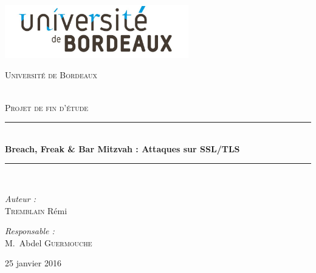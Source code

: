 \documentclass[a4paper,11pt,final]{article}
\newcommand{\reporttitle}{Breach, Freak \& Bar Mitzvah : Attaques sur SSL/TLS}     %
\newcommand{\reportauthor}{\textsc{Tremblain} Rémi} %
\newcommand{\reportsubject}{Projet de fin d'étude} %
\newcommand{\HRule}{\rule{\linewidth}{0.5mm}}
\begin{document}
%

\begin{titlepage}

\begin{center}

\begin{minipage}[t]{0.48\textwidth}
  \begin{flushleft}
    \includegraphics [width=80mm]{images/logo-univ.jpg} \\[0.5cm]
    \begin{spacing}{1.5}
      \textsc{\LARGE Université de Bordeaux}
    \end{spacing}
  \end{flushleft}
\end{minipage} \\[3.5cm]

\textsc{\Large \reportsubject}\\[0.5cm]
\HRule \\[0.4cm]
{\huge \bfseries \reporttitle}\\[0.4cm]
\HRule \\[1.5cm]

\begin{minipage}[t]{0.3\textwidth}
  \begin{flushleft} \large
    \emph{Auteur :}\\
    \reportauthor
  \end{flushleft}
\end{minipage}
\begin{minipage}[t]{0.6\textwidth}
  \begin{flushright} \large
    \emph{Responsable :} \\
    M.~Abdel \textsc{Guermouche} \\
  \end{flushright}
\end{minipage}

\vfill

{\large 25 janvier 2016}

\end{center}

\end{titlepage}
\cleardoublepage %
\end{document}
